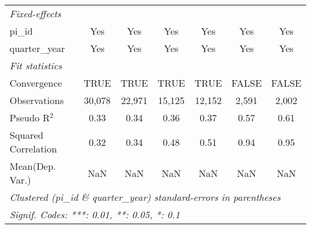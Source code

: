 \begin{tabular}{lcccccc}
   \midrule
   \emph{Fixed-effects}\\
   pi\_id                                                     & Yes           & Yes           & Yes           & Yes           & Yes           & Yes\\  
   quarter\_year                                              & Yes           & Yes           & Yes           & Yes           & Yes           & Yes\\  
   \midrule
   \emph{Fit statistics}\\
   Convergence                                                &TRUE           & TRUE          & TRUE          & TRUE          & FALSE         & FALSE\\  
   Observations                                               & 30,078        & 22,971        & 15,125        & 12,152        & 2,591         & 2,002\\  
   Pseudo R$^2$                                               & 0.33          & 0.34          & 0.36          & 0.37          & 0.57          & 0.61\\  
   Squared Correlation                                        & 0.32          & 0.34          & 0.48          & 0.51          & 0.94          & 0.95\\  
Mean(Dep. Var.) & NaN & NaN & NaN & NaN & NaN & NaN \\
   \midrule \midrule
   \multicolumn{7}{l}{\emph{Clustered (pi\_id \& quarter\_year) standard-errors in parentheses}}\\
   \multicolumn{7}{l}{\emph{Signif. Codes: ***: 0.01, **: 0.05, *: 0.1}}\\
\end{tabular}
\par\endgroup
